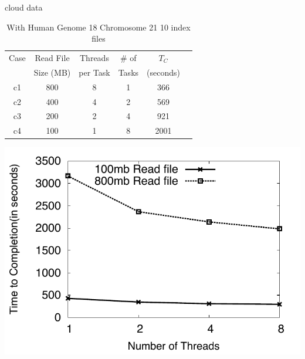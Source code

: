 \documentclass{article}
\begin{document}
cloud data
 \begin{table}
 \small
 \begin{tabular}{|c|c|c|c|c|c|} 
 \hline 
Case & Read File  & Threads & \# of   & $T_C$ \\
& Size  (MB)&  per Task&  Tasks &  (seconds)  \\  \hline
c1 & 800 &  8 & 1 &366  \\
c2 & 400  & 4 & 2 &569  \\
c3 & 200 & 2 & 4 & 921  \\ 
c4& 100 & 1 & 8& 2001 \\
 \hline
 \end{tabular}
 \caption{With  Human Genome 18 Chromosome 21 10 index files   }
\end{table}

\includegraphics[scale=0.66]{../figures/cloud_threadsvstime.pdf} 
\end{document}
